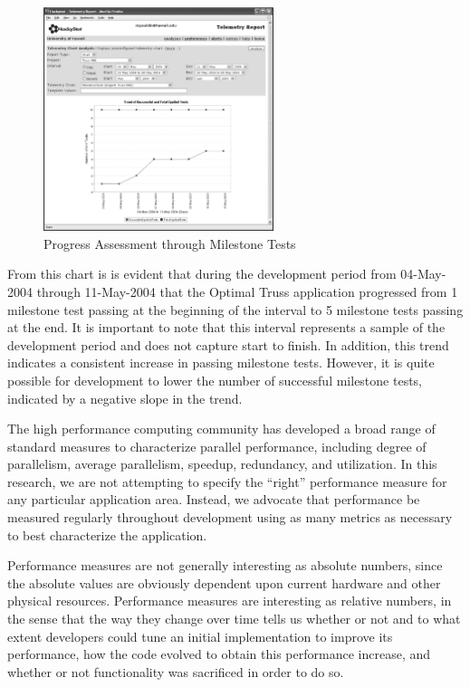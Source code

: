 \documentclass[times,10pt,twocolumn]{article}
\begin{document}
\begin{figure}[htpb]
  \centering
  \includegraphics[width=0.60\textwidth]{truss.functionality.eps}
  \caption{Progress Assessment through Milestone Tests}
  \label{fig:functionality}
\end{figure}

From this chart is is evident that during the development period from
04-May-2004 through 11-May-2004 that the Optimal Truss application
progressed from 1 milestone test passing at the beginning of the
interval to 5 milestone tests passing at the end.  It is important to
note that this interval represents a sample of the development period
and does not capture start to finish.  In addition, this trend
indicates a consistent increase in passing milestone tests.  However,
it is quite possible for development to lower the number of successful
milestone tests, indicated by a negative slope in the trend.


The high performance computing community has developed a broad range of
standard measures to characterize parallel performance, including degree of
parallelism, average parallelism, speedup, redundancy, and utilization.
In this research, we are not attempting to specify the ``right'' performance
measure for any particular application area. Instead, we advocate that 
performance be measured regularly throughout development using as many metrics
as necessary to best characterize the application. 

Performance measures are not generally interesting as absolute numbers,
since the absolute values are obviously dependent upon current hardware and
other physical resources. Performance measures are interesting as relative
numbers, in the sense that the way they change over time tells us whether
or not and to what extent developers could tune an initial implementation
to improve its performance, how the code evolved to obtain this performance
increase, and whether or not functionality was sacrificed in order to do
so.
\end{document}
